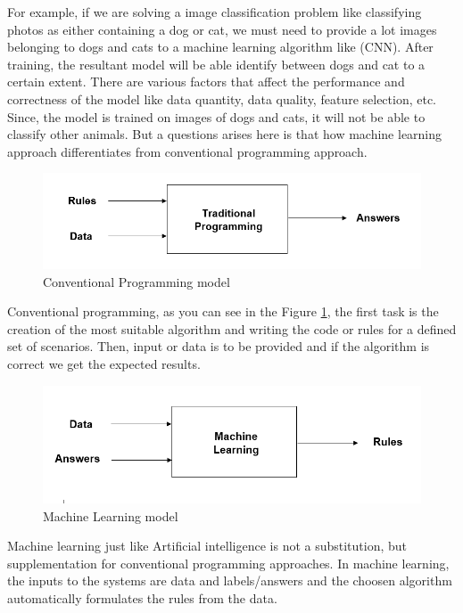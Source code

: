 For example, if we are solving a image classification problem like classifying photos as either containing a dog or cat, we must need to provide a lot images belonging to dogs and cats to a machine learning algorithm like (CNN). After training, the resultant model will be able identify between dogs and cat to a certain extent. There are various factors that affect the performance and correctness of the model like data quantity, data quality, feature selection, etc. Since, the model is trained on images of dogs and cats, it will not be able to classify other animals. But a questions arises here is that how machine learning approach differentiates from conventional programming approach.

\begin{figure}[H]
\centering
\includegraphics[scale=0.7]{images/Chapter2/TP.PNG}
\caption{Conventional Programming model}
\label{tp-model}
\end{figure}
\par

Conventional programming, as you can see in the Figure \ref{tp-model}, the first task is the creation of the most suitable algorithm and writing the code or rules for a defined set of scenarios. Then, input or data is to be provided and if the algorithm is correct we get the expected results.



\begin{figure}[H]
  \centering
  \includegraphics[scale=0.7]{images/Chapter2/ML.PNG}
  \caption{Machine Learning model}
  \label{mlp-model}
\end{figure}
\par
Machine learning just like Artificial intelligence is not a substitution, but supplementation for conventional programming approaches. In machine learning, the inputs to the systems are data and labels/answers and the choosen algorithm automatically formulates the rules from the data.

